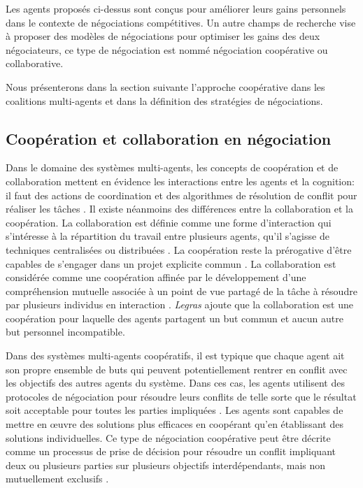 	Les agents proposés ci-dessus sont conçus pour améliorer leurs gains personnels dans le contexte de négociations compétitives. Un autre champs de recherche vise à proposer des modèles de négociations pour optimiser les gains des deux négociateurs, ce type de négociation est nommé négociation coopérative ou collaborative. 
	
	Nous présenterons dans la section suivante l'approche coopérative dans les coalitions multi-agents et dans la définition des stratégies de négociations. 
	
		\subsection{Coopération et collaboration en négociation}
		
		Dans le domaine des systèmes multi-agents, les concepts de coopération et de collaboration mettent en évidence les interactions entre les agents et la cognition: il faut des actions de coordination et des algorithmes de résolution de conflit pour réaliser les tâches \cite{jennings1995controlling}. Il existe néanmoins des différences entre la collaboration et la coopération.
		La collaboration est définie comme une forme d'interaction qui s'intéresse à la répartition du travail entre plusieurs agents, qu'il s'agisse de techniques centralisées ou distribuées \cite{ferber1997systemes}. La coopération reste la prérogative d'être capables de s'engager dans un projet explicite commun \cite{lucien2016multiagent}.
		La collaboration est considérée comme une coopération affinée par le développement d'une compréhension mutuelle associée à un point de vue partagé de la tâche à résoudre par plusieurs individus en interaction \cite{weiss1999multiagent,blanquet2007web}. \emph{Legras} \cite{legrascooperation} ajoute que la collaboration est une coopération pour laquelle des agents partagent un but commun et aucun autre but personnel incompatible. 
		
		Dans des systèmes multi-agents coopératifs, il est typique que chaque agent ait son propre ensemble de buts qui peuvent potentiellement rentrer en conflit avec les objectifs des autres agents du système.
		 Dans ces cas, les agents utilisent des protocoles de négociation pour résoudre leurs conflits de telle sorte que le résultat soit acceptable pour toutes les parties impliquées \cite{wollkind2004automated}. Les agents sont capables de mettre en œuvre des solutions plus efficaces en coopérant qu'en établissant des solutions individuelles. Ce type de négociation coopérative peut être décrite comme un processus de prise de décision pour résoudre un conflit impliquant deux ou plusieurs parties sur plusieurs objectifs interdépendants, mais non mutuellement exclusifs \cite{lewicki2011essentials}. 
	
